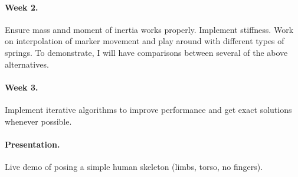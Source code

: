 \documentclass[10pt,twocolumn,letterpaper]{article}
\begin{document}
\paragraph{Week 2.} Ensure mass annd moment of inertia works properly. Implement stiffness. Work on interpolation of marker movement and play around with different types of springs. To demonstrate, I will have comparisons between several of the above alternatives.

\paragraph{Week 3.} Implement iterative algorithms to improve performance and get exact solutions whenever possible.

\paragraph{Presentation.} Live demo of posing a simple human skeleton (limbs, torso, no fingers).



\end{document}
